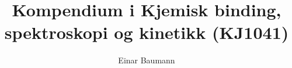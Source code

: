 \documentclass[english,norsk]{report}
\numberwithin{equation}{section}
\numberwithin{figure}{section}
\theoremstyle{definition}
\theoremstyle{definition}
\theoremstyle{remark}
\theoremstyle{plain}
\begin{document}
\title{Kompendium i Kjemisk binding, spektroskopi og kinetikk (KJ1041)}


\author{Einar Baumann}
\end{document}
